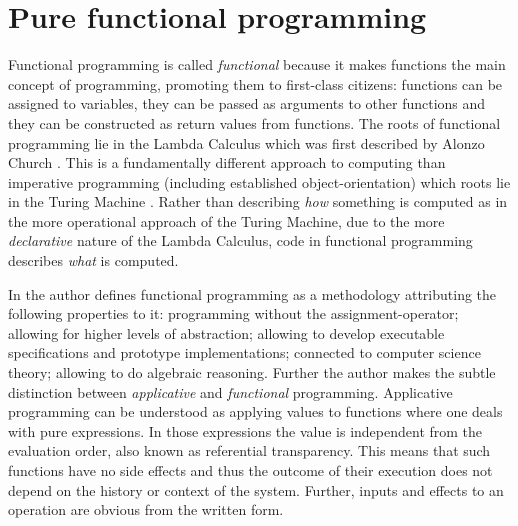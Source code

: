 \section{Pure functional programming}
\label{sec:background_fp}
Functional programming is called \textit{functional} because it makes functions the main concept of programming, promoting them to first-class citizens: functions can be assigned to variables, they can be passed as arguments to other functions and they can be constructed as return values from functions. The roots of functional programming lie in the Lambda Calculus which was first described by Alonzo Church \cite{church_unsolvable_1936}. This is a fundamentally different approach to computing than imperative programming (including established object-orientation)  which roots lie in the Turing Machine \cite{turing_computable_1937}. Rather than describing \textit{how} something is computed as in the more operational approach of the Turing Machine, due to the more \textit{declarative} nature of the Lambda Calculus, code in functional programming describes \textit{what} is computed.

In \cite{maclennan_functional_1990} the author defines functional programming as a methodology attributing the following properties to it: programming without the assignment-operator; allowing for higher levels of abstraction; allowing to develop executable specifications and prototype implementations; connected to computer science theory; allowing to do algebraic reasoning. Further the author makes the subtle distinction between \textit{applicative} and \textit{functional} programming. Applicative programming can be understood as applying values to functions where one deals with pure expressions. In those expressions the value is independent from the evaluation order, also known as referential transparency. This means that such functions have no side effects and thus the outcome of their execution does not depend on the history or context of the system. Further, inputs and effects to an operation are obvious from the written form.

